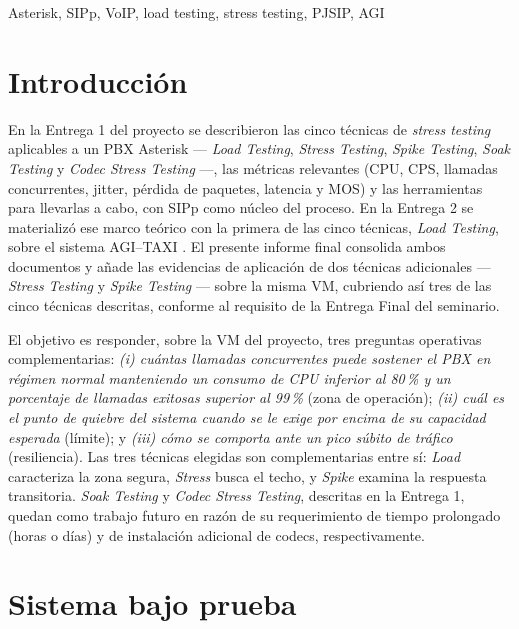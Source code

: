 \documentclass[conference]{IEEEtran}
\begin{document}
\begin{IEEEkeywords}
Asterisk, SIPp, VoIP, load testing, stress testing, PJSIP, AGI
\end{IEEEkeywords}

\section{Introducci\'on}

En la Entrega 1 del proyecto se describieron las cinco t\'ecnicas de
\textit{stress testing} aplicables a un PBX Asterisk ---
\textit{Load Testing}, \textit{Stress Testing}, \textit{Spike Testing},
\textit{Soak Testing} y \textit{Codec Stress Testing} ---, las
m\'etricas relevantes (CPU, CPS, llamadas concurrentes, jitter,
p\'erdida de paquetes, latencia y MOS) y las herramientas para llevarlas
a cabo, con SIPp \cite{ref_sipp} como n\'ucleo del proceso. En la
Entrega 2 se materializ\'o ese marco te\'orico con la primera de las
cinco t\'ecnicas, \textit{Load Testing}, sobre el sistema AGI--TAXI
\cite{ref_agitaxi}. El presente informe final consolida ambos
documentos y a\~nade las evidencias de aplicaci\'on de dos t\'ecnicas
adicionales --- \textit{Stress Testing} y \textit{Spike Testing} ---
sobre la misma VM, cubriendo as\'i tres de las cinco t\'ecnicas
descritas, conforme al requisito de la Entrega Final del seminario.

El objetivo es responder, sobre la VM del proyecto, tres preguntas
operativas complementarias: \textit{(i) cu\'antas llamadas
concurrentes puede sostener el PBX en r\'egimen normal manteniendo un
consumo de CPU inferior al 80\,\% y un porcentaje de llamadas exitosas
superior al 99\,\%} (zona de operaci\'on); \textit{(ii) cu\'al es el
punto de quiebre del sistema cuando se le exige por encima de su
capacidad esperada} (l\'imite); y \textit{(iii) c\'omo se comporta
ante un pico s\'ubito de tr\'afico} (resiliencia). Las tres t\'ecnicas
elegidas son complementarias entre s\'i: \textit{Load} caracteriza la
zona segura, \textit{Stress} busca el techo, y \textit{Spike} examina
la respuesta transitoria. \textit{Soak Testing} y \textit{Codec
Stress Testing}, descritas en la Entrega 1, quedan como trabajo futuro
en raz\'on de su requerimiento de tiempo prolongado (horas o d\'ias) y
de instalaci\'on adicional de codecs, respectivamente.

\section{Sistema bajo prueba}
\end{document}
